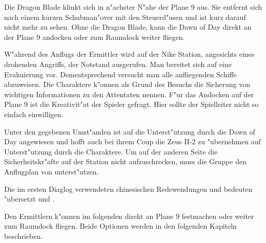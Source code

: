 Die Dragon Blade klinkt sich in n"achster N"ahe der Plane 9 aus. Sie entfernt sich nach einem kurzen Schubman"over mit den Steuerd"usen und ist kurz darauf nicht mehr zu sehen.  Ohne die Dragon Blade, kann die Dawn of Day direkt an der Plane 9 andocken oder zum Raumdock weiter fliegen.

\begin{remarks}
	W"ahrend des Anflugs der Ermittler wird auf der Nike Station, angesichts eines drohenden Angriffs, der Notstand ausgerufen. Man bereitet sich auf eine Evakuierung vor. Dementsprechend versucht man alle anfliegenden Schiffe abzuweisen. Die Charaktere k"onnen als Grund des Besuchs die Sicherung von wichtigen Informationen zu den Attentaten nennen. F"ur das Andocken auf der Plane 9 ist die Kreativit"at der Spieler gefragt. Hier sollte der Spielleiter nicht so einfach einwilligen.

	Unter den gegebenen Umst"anden ist \xl{} auf die Unterst"utzung durch die Dawn of Day angewiesen und hofft auch bei ihrem Coup die Zeus II-2 zu "ubernehmen auf Unterst"utzung durch die Charaktere. Um auf der anderen Seite die Sicherheitskr"afte auf der Station nicht aufzuschrecken, muss die Gruppe den Anflugplan von \xl{} unterst"utzen.

	Die im ersten Diaglog verwendeten chinesischen Redewendungen  und   bedeuten "ubersetzt  und .

	Den Ermittlern k"onnen im folgenden direkt an Plane 9 festmachen oder weiter zum Raumdock fliegen. Beide Optionen werden in den folgenden Kapiteln beschrieben.
\end{remarks}
